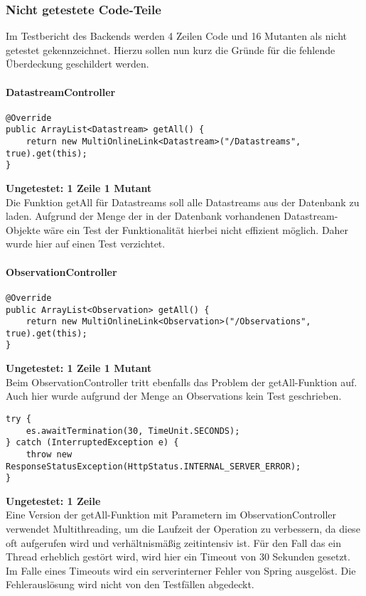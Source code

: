 \subsubsection{Nicht getestete Code-Teile}
Im Testbericht des Backends werden 4 Zeilen Code und 16 Mutanten als nicht getestet gekennzeichnet.
Hierzu sollen nun kurz die Gründe für die fehlende Überdeckung geschildert werden.

\paragraph{DatastreamController}
\begin{lstlisting}[style=customjava]
@Override
public ArrayList<Datastream> getAll() {
    return new MultiOnlineLink<Datastream>("/Datastreams", true).get(this);
}
\end{lstlisting}
\textbf{Ungetestet: 1 Zeile 1 Mutant}
\\
Die Funktion getAll für Datastreams soll alle Datastreams aus der Datenbank zu laden.
Aufgrund der Menge der in der Datenbank vorhandenen Datastream-Objekte wäre ein Test der Funktionalität hierbei nicht effizient möglich.
Daher wurde hier auf einen Test verzichtet.

\paragraph{ObservationController}
\begin{lstlisting}[style=customjava]
@Override
public ArrayList<Observation> getAll() {
    return new MultiOnlineLink<Observation>("/Observations", true).get(this);
}
\end{lstlisting}
\textbf{Ungetestet: 1 Zeile 1 Mutant}
\\
Beim ObservationController tritt ebenfalls das Problem der getAll-Funktion auf.
Auch hier wurde aufgrund der Menge an Observations kein Test geschrieben.

\begin{lstlisting}[style=customjava]
try {
    es.awaitTermination(30, TimeUnit.SECONDS);
} catch (InterruptedException e) {
    throw new ResponseStatusException(HttpStatus.INTERNAL_SERVER_ERROR);
}
\end{lstlisting}
\textbf{Ungetestet: 1 Zeile}
\\
Eine Version der getAll-Funktion mit Parametern im ObservationController verwendet Multithreading, um die Laufzeit der Operation zu verbessern, da diese oft aufgerufen wird und verhältnismäßig zeitintensiv ist.
Für den Fall das ein Thread erheblich gestört wird, wird hier ein Timeout von 30 Sekunden gesetzt. Im Falle eines Timeouts wird ein serverinterner Fehler von Spring ausgelöst.
Die Fehlerauslösung wird nicht von den Testfällen abgedeckt.

